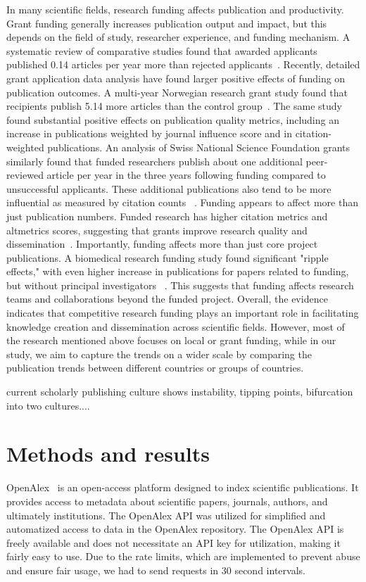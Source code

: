 \documentclass[amsfonts, amssymb, prl, superscriptaddress, notitlepage, twocolumn, nofootinbib]{revtex4-2}
\begin{document}
In many scientific fields, research funding affects publication and productivity. Grant funding generally increases publication output and impact, but this depends on the field of study, researcher experience, and funding mechanism. A systematic review of comparative studies found that awarded applicants published 0.14 articles per year more than rejected applicants~\cite{saygitov2018impact}. Recently, detailed grant application data analysis have found larger positive effects of funding on publication outcomes. A multi-year Norwegian research grant study found that recipients publish 5.14 more articles than the control group~\cite{adda2023impact}. The same study found substantial positive effects on publication quality metrics, including an increase in publications weighted by journal influence score and in citation-weighted publications. An analysis of Swiss National Science Foundation grants similarly found that funded researchers publish about one additional peer-reviewed article per year in the three years following funding compared to unsuccessful applicants. These additional publications also tend to be more influential as measured by citation counts ~\cite{ heyard2021value}. Funding appears to affect more than just publication numbers. Funded research has higher citation metrics and altmetrics scores, suggesting that grants improve research quality and dissemination~\cite{heyard2021value}. Importantly, funding affects more than just core project publications. A biomedical research funding study found significant "ripple effects," with even higher increase in publications for papers related to funding, but without principal investigators ~\cite{sattari2022ripple}. This suggests that funding affects research teams and collaborations beyond the funded project. Overall, the evidence indicates that competitive research funding plays an important role in facilitating knowledge creation and dissemination across scientific fields. However, most of the research mentioned above focuses on local or grant funding, while in our study, we aim to capture the trends on a wider scale by comparing the publication trends between different countries or groups of countries.

current scholarly publishing culture shows instability, tipping points, bifurcation into two cultures....

\section{Methods and results}
OpenAlex~\cite{priem2022openalex} is an open-access platform designed to index scientific publications. It provides access to metadata about scientific papers, journals, authors, and ultimately institutions. The OpenAlex API was utilized for simplified and automatized access to data in the OpenAlex repository. The OpenAlex API is freely available and does not necessitate an API key for utilization, making it fairly easy to use. Due to the rate limits, which are implemented to prevent abuse and ensure fair usage, we had to send requests in 30 second intervals. 
\end{document}
